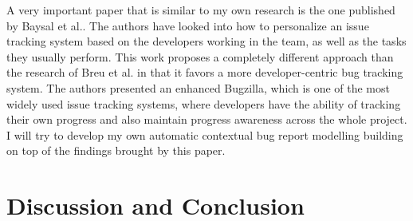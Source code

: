 \documentclass[11pt,english,twocolumn]{article}
\begin{document}
A very important paper that is similar to my own research is the one 
published by Baysal et al.\cite{baysal2013situational}. The authors
have looked into how to personalize an issue tracking system based on the
developers working in the team, as well as the tasks they usually perform.
This work proposes a completely different approach than the research of
Breu et al.\cite{breu2010information} in that it favors a more 
developer-centric bug tracking system. The authors presented an enhanced
Bugzilla, which is one of the most widely used issue tracking systems, where
developers have the ability of tracking their own progress and also maintain
progress awareness across the whole project. I will try to develop my
own automatic contextual bug report modelling building on top of the findings
brought by this paper.





\section{Discussion and Conclusion}
\label{sec:conclusion}




\let\oldbibliography\thebibliography
\renewcommand{\thebibliography}[1]{\oldbibliography{#1}
\setlength{\itemsep}{-3pt}}


{
\scriptsize

}
\end{document}

